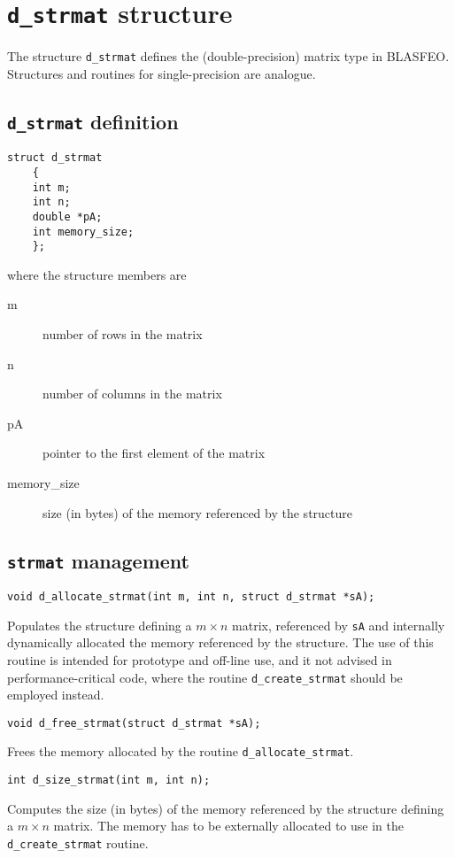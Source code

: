 \documentclass[a4paper]{report}
\begin{document}
\section{{\tt d\_strmat} structure}

The structure {\tt d\_strmat} defines the (double-precision) matrix type in BLASFEO.
Structures and routines for single-precision are analogue.



\subsection{{\tt d\_strmat} definition}

\begin{verbatim}
struct d_strmat 
    {
    int m;
    int n;
    double *pA;
    int memory_size;
    };
\end{verbatim}
where the structure members are
\begin{description}
\item[m] number of rows in the matrix
\item[n] number of columns in the matrix
\item[pA] pointer to the first element of the matrix
\item[memory\_size] size (in bytes) of the memory referenced by the structure
\end{description}



\subsection{{\tt strmat} management}

\begin{verbatim}
void d_allocate_strmat(int m, int n, struct d_strmat *sA);
\end{verbatim}
Populates the structure defining a $m\times n$ matrix, referenced by {\tt sA} and internally dynamically allocated the memory referenced by the structure.
The use of this routine is intended for prototype and off-line use, and it not advised in performance-critical code, where the routine {\tt d\_create\_strmat} should be employed instead.

\begin{verbatim}
void d_free_strmat(struct d_strmat *sA);
\end{verbatim}
Frees the memory allocated by the routine {\tt d\_allocate\_strmat}.

\begin{verbatim}
int d_size_strmat(int m, int n);
\end{verbatim}
Computes the size (in bytes) of the memory referenced by the structure defining a $m\times n$ matrix.
The memory has to be externally allocated to use in the {\tt d\_create\_strmat} routine.
\end{document}

